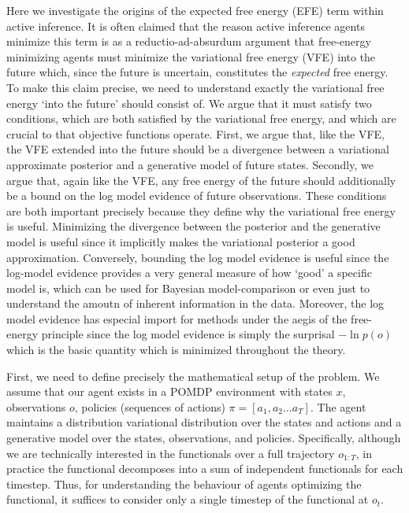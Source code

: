 Here we investigate the origins of the expected free energy (EFE) term within active inference. It is often claimed that the reason active inference agents minimize this term is as a reductio-ad-absurdum argument that free-energy minimizing agents must minimize the variational free energy (VFE) into the future which, since the future is uncertain, constitutes the \emph{expected} free energy. To make this claim precise, we need to understand exactly the variational free energy `into the future' should consist of. We argue that it must satisfy two conditions, which are both satisfied by the variational free energy, and which are crucial to that objective functions operate. First, we argue that, like the VFE, the VFE extended into the future should be a divergence between a variational approximate posterior and a generative model of future states. Secondly, we argue that, again like the VFE, any free energy of the future should additionally be a bound on the log model evidence of future observations. These conditions are both important precisely because they define why the variational free energy is useful. Minimizing the divergence between the posterior and the generative model is useful since it implicitly makes the variational posterior a good approximation. Conversely, bounding the log model evidence is useful since the log-model evidence provides a very general measure of how `good' a specific model is, which can be used for Bayesian model-comparison or even just to understand the amoutn of inherent information in the data. Moreover, the log model evidence has especial import for methods under the aegis of the free-energy principle since the log model evidence is simply the surprisal $-\ln p(o)$ which is the basic quantity which is minimized throughout the theory.

First, we need to define precisely the mathematical setup of the problem. We assume that our agent exists in a POMDP environment with states $x$, observations $o$, policies (sequences of actions) $\pi = [a_1, a_2 \dots a_T]$. The agent maintains a distribution variational distribution over the states and actions and a generative model over the states, observations, and policies. Specifically, although we are technically interested in the functionals over a full trajectory $o_{1:T}$, in practice the functional decomposes into a sum of independent functionals for each timestep. Thus, for understanding the behaviour of agents optimizing the functional, it suffices to consider only a single timestep of the functional at $o_t$.

